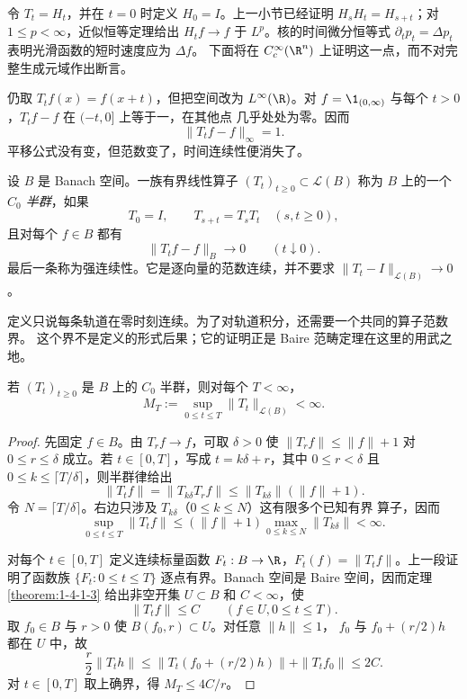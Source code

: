 \begin{example}[热半群]\label{ex:4-4-3-2}
令 $T_t=H_t$，并在 $t=0$ 时定义 $H_0=I$。上一小节已经证明
$H_sH_t=H_{s+t}$；对 $1\le p<\infty$，近似恒等定理给出
$H_tf\to f$ 于 $L^p$。核的时间微分恒等式
$\partial_tp_t=\Delta p_t$ 表明光滑函数的短时速度应为 $\Delta f$。
下面将在 $C_c^\infty(\R^n)$ 上证明这一点，而不对完整生成元域作出断言。
\end{example}

\begin{example}\label{ex:4-4-3-3}
仍取 $T_tf(x)=f(x+t)$，但把空间改为 $L^\infty(\R)$。对
$f=\1_{(0,\infty)}$ 与每个 $t>0$，$T_tf-f$ 在 $(-t,0]$ 上等于一，在其他点
几乎处处为零。因而
\[
  \|T_tf-f\|_\infty=1.
\]
平移公式没有变，但范数变了，时间连续性便消失了。
\end{example}

\begin{definition}[$C_0$ 半群]\label{def:4-4-3-1}
设 $B$ 是 Banach 空间。一族有界线性算子
$(T_t)_{t\ge0}\subset\mathcal L(B)$ 称为 $B$ 上的一个\emph{$C_0$ 半群}，如果
\[
 T_0=I,\qquad T_{s+t}=T_sT_t\quad(s,t\ge0),
\]
且对每个 $f\in B$ 都有
\[
 \|T_tf-f\|_B\longrightarrow0\qquad(t\downarrow0).
\]
最后一条称为强连续性。它是逐向量的范数连续，并不要求
$\|T_t-I\|_{\mathcal L(B)}\to0$。
\end{definition}

定义只说每条轨道在零时刻连续。为了对轨道积分，还需要一个共同的算子范数界。
这个界不是定义的形式后果；它的证明正是 Baire 范畴定理在这里的用武之地。

\begin{proposition}[紧时间区间上的一致有界]\label{proposition:4-4-3-0}
若 $(T_t)_{t\ge0}$ 是 $B$ 上的 $C_0$ 半群，则对每个 $T<\infty$，
\[
  M_T:=\sup_{0\le t\le T}\|T_t\|_{\mathcal L(B)}<\infty.
\]
\end{proposition}

\begin{proof}
先固定 $f\in B$。由 $T_rf\to f$，可取 $\delta>0$ 使
$\|T_rf\|\le\|f\|+1$ 对 $0\le r\le\delta$ 成立。若
$t\in[0,T]$，写成 $t=k\delta+r$，其中
$0\le r<\delta$ 且 $0\le k\le\lceil T/\delta\rceil$，则半群律给出
\[
  \|T_tf\|=\|T_{k\delta}T_rf\|
  \le \|T_{k\delta}\|(\|f\|+1).
\]
令 $N=\lceil T/\delta\rceil$。右边只涉及 $T_{k\delta}$（$0\leq k\leq N$）这有限多个已知有界
算子，因而
\[
 \sup_{0\leq t\leq T}\|T_tf\|
 \leq(\|f\|+1)\max_{0\leq k\leq N}\|T_{k\delta}\|<\infty.
\]

对每个 $t\in[0,T]$ 定义连续标量函数
$F_t:B\to\R$，$F_t(f)=\|T_tf\|$。上一段证明了函数族
$\{F_t:0\le t\le T\}$ 逐点有界。Banach 空间是 Baire 空间，因而定理
\ref{theorem:1-4-1-3} 给出非空开集 $U\subset B$ 和 $C<\infty$，使
\[
  \|T_tf\|\le C\qquad(f\in U, 0\le t\le T).
\]
取 $f_0\in B$ 与 $r>0$ 使 $B(f_0,r)\subset U$。对任意 $\|h\|\le1$，
$f_0$ 与 $f_0+(r/2)h$ 都在 $U$ 中，故
\[
 \frac r2\|T_th\|
 \le \|T_t(f_0+(r/2)h)\|+\|T_tf_0\|
 \le2C.
\]
对 $t\in[0,T]$ 取上确界，得 $M_T\le4C/r$。
\end{proof}


